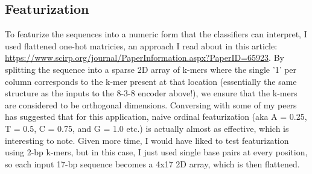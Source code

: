 \documentclass[12pt]{article}
\begin{document}
\subsection*{Featurization}
To featurize the sequences into a numeric form that the classifiers can interpret, I used flattened one-hot matricies, an approach I read about in this article: \url{https://www.scirp.org/journal/PaperInformation.aspx?PaperID=65923}. By splitting the sequence into a sparse 2D array of k-mers where the single '1' per column corresponds to the k-mer present at that location (essentially the same structure as the inputs to the 8-3-8 encoder above!), we ensure that the k-mers are considered to be orthogonal dimensions. Conversing with some of my peers has suggested that for this application, naive ordinal featurization (aka A = 0.25, T = 0.5, C = 0.75, and G = 1.0 etc.) is actually almost as effective, which is interesting to note. Given more time, I would have liked to test featurization using 2-bp k-mers, but in this case, I just used single base pairs at every position, so each input 17-bp sequence becomes a 4x17 2D array, which is then flattened. 
\end{document}
